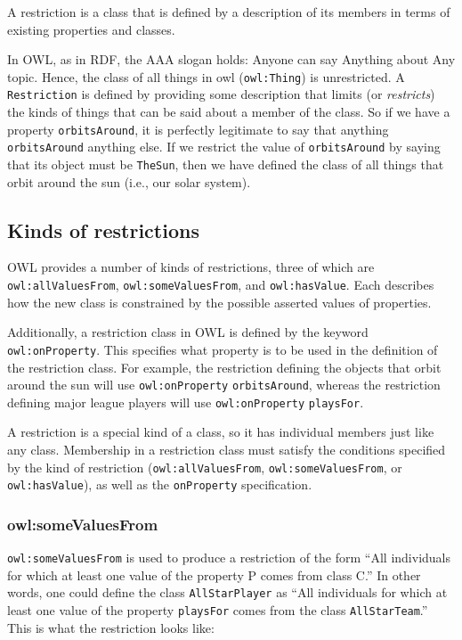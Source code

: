 A restriction is a class that is defined by a description of its members
in terms of existing properties and classes.

In OWL, as in RDF, the AAA slogan holds: Anyone can say Anything about
Any topic. Hence, the class of all things in owl (\texttt{owl:Thing}) is
unrestricted. A \texttt{Restriction} is defined by providing some description
that limits (or \emph{restricts}) the kinds of things that can be said about a
member of the class. So if we have a property \texttt{orbitsAround}, it is
perfectly legitimate to say that anything \texttt{orbitsAround} anything else. If
we restrict the value of \texttt{orbitsAround} by saying that its object must be
\texttt{TheSun}, then we have defined the class of all things that orbit around
the sun (i.e., our solar system).

\subsection{Kinds of restrictions}
\label{ch12.restriction}
OWL provides a number of kinds of restrictions, three of which are
\texttt{owl:allValuesFrom}, \texttt{owl:someValuesFrom}, and \texttt{owl:hasValue}. Each describes
how the new class is constrained by the possible asserted values of
properties.

Additionally, a restriction class in OWL is defined by the keyword
\texttt{owl:onProperty}. This specifies what property is to be used in the
definition of the restriction class. For example, the restriction
defining the objects that orbit around the sun will use \texttt{owl:onProperty}
\texttt{orbitsAround}, whereas the restriction defining major league players will
use \texttt{owl:onProperty} \texttt{playsFor}.

A restriction is a special kind of a class, so it has individual members
just like any class.
Membership in a restriction class must satisfy the conditions specified
by the kind of restriction (\texttt{owl:allValuesFrom}, \texttt{owl:someValuesFrom}, or
\texttt{owl:hasValue}), as well as the \texttt{onProperty} specification.

\subsubsection{owl:someValuesFrom}
\label{ch12.somevaluesfrom}
\texttt{owl:someValuesFrom} is used to produce a restriction of the form ``All
individuals for which at least one value of the property P comes from
class C.'' In other words, one could define the class
\texttt{AllStarPlayer} as ``All individuals for which at least one value of the
property \texttt{playsFor} comes from the class \texttt{AllStarTeam}.'' This is what the
restriction looks like:


